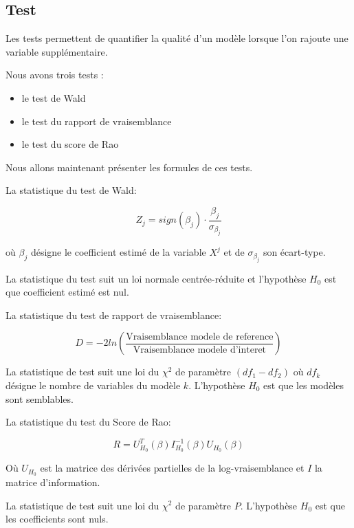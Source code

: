 \documentclass[10pt,french]{report}
\begin{document}
	\subsection{Test}

	Les tests permettent de quantifier la qualité d’un modèle lorsque l'on rajoute une variable supplémentaire. 

	Nous avons trois tests : 
	\begin{itemize}
		\item le test de Wald  
		\item le test du rapport de vraisemblance 
		\item le test du score de Rao 
	\end{itemize}
	
	Nous allons maintenant présenter les formules de ces tests.
	
	La statistique du test de Wald:

	\begin{equation}
		Z_j = sign(\beta_j) \cdot \frac{\beta_j}{\sigma_{\beta_j}}
	\end{equation}
	
	où $\beta_j$ désigne le coefficient estimé de la variable $X^j$ et de $\sigma_{\beta_j}$ son écart-type.

	La statistique du test suit un loi normale centrée-réduite et l’hypothèse $H_0$ est que coefficient estimé est nul.

	La statistique du test de rapport de vraisemblance:

	\begin{equation}
	D = -2 ln (\frac{\mbox{Vraisemblance modele de reference}}{\mbox{Vraisemblance modele d'interet}})
	\end{equation}

	La statistique de test suit une loi du $\chi^2$ de paramètre $(df_1 - df_2)$ où $df_k$ désigne le nombre de variables du modèle $k$. L’hypothèse $H_0$ est que les modèles sont semblables.

	La statistique du test du Score de Rao:

	\begin{equation}
	R = U_{H_0} ^T (\beta) I_{H_0} ^{-1} (\beta) U_{H_0} (\beta)
	\end{equation}

	Où $U_{H_0}$ est la matrice des dérivées partielles de la log-vraisemblance et $I$ la matrice d’information.

	La statistique de test suit une loi du $\chi ^2$ de paramètre $P$. L’hypothèse $H_0$ est que les coefficients sont nuls.
\end{document}
